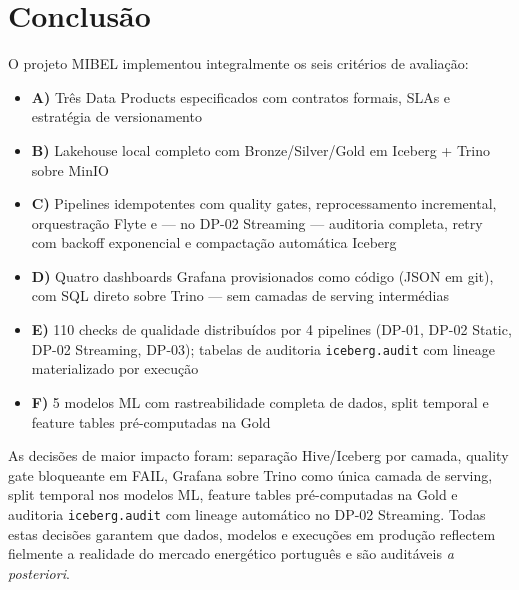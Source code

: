 \documentclass[11pt,a4paper]{article}
\begin{document}
\section{Conclusão}

O projeto MIBEL implementou integralmente os seis critérios de avaliação:

\begin{itemize}[leftmargin=*]
  \item \textbf{A)} Três Data Products especificados com contratos formais, SLAs e estratégia de versionamento
  \item \textbf{B)} Lakehouse local completo com Bronze/Silver/Gold em Iceberg + Trino sobre MinIO
  \item \textbf{C)} Pipelines idempotentes com quality gates, reprocessamento incremental, orquestração Flyte e --- no DP-02 Streaming --- auditoria completa, retry com backoff exponencial e compactação automática Iceberg
  \item \textbf{D)} Quatro dashboards Grafana provisionados como código (JSON em git), com SQL direto sobre Trino --- sem camadas de serving intermédias
  \item \textbf{E)} 110 checks de qualidade distribuídos por 4 pipelines (DP-01, DP-02 Static, DP-02 Streaming, DP-03); tabelas de auditoria \texttt{iceberg.audit} com lineage materializado por execução
  \item \textbf{F)} 5 modelos ML com rastreabilidade completa de dados, split temporal e feature tables pré-computadas na Gold
\end{itemize}

As decisões de maior impacto foram: separação Hive/Iceberg por camada, quality gate bloqueante em FAIL, Grafana sobre Trino como única camada de serving, split temporal nos modelos ML, feature tables pré-computadas na Gold e auditoria \texttt{iceberg.audit} com lineage automático no DP-02 Streaming. Todas estas decisões garantem que dados, modelos e execuções em produção reflectem fielmente a realidade do mercado energético português e são auditáveis \textit{a posteriori}.

\end{document}
